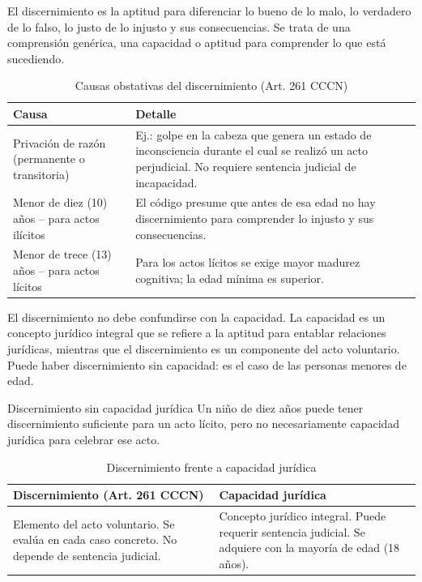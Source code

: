 \documentclass[12pt,oneside]{book}
\begin{document}
El discernimiento es la aptitud para diferenciar lo bueno de lo malo, lo verdadero de lo falso, lo justo de lo injusto y sus consecuencias. Se trata de una comprensión genérica, una capacidad o aptitud para comprender lo que está sucediendo.

\begin{table}[H]
\centering
\caption{Causas obstativas del discernimiento (Art. 261 CCCN)}
\begin{tabularx}{\textwidth}{l X}
\toprule
\textbf{Causa} & \textbf{Detalle} \\
\midrule
Privación de razón (permanente o transitoria) & Ej.: golpe en la cabeza que genera un estado de inconsciencia durante el cual se realizó un acto perjudicial. No requiere sentencia judicial de incapacidad. \\
Menor de diez (10) años -- para actos ilícitos & El código presume que antes de esa edad no hay discernimiento para comprender lo injusto y sus consecuencias. \\
Menor de trece (13) años -- para actos lícitos & Para los actos lícitos se exige mayor madurez cognitiva; la edad mínima es superior. \\
\bottomrule
\end{tabularx}
\end{table}

\begin{important}
El discernimiento no debe confundirse con la capacidad. La capacidad es un concepto jurídico integral que se refiere a la aptitud para entablar relaciones jurídicas, mientras que el discernimiento es un componente del acto voluntario. Puede haber discernimiento sin capacidad: es el caso de las personas menores de edad.
\end{important}

\begin{example}{Discernimiento sin capacidad jurídica}
Un niño de diez años puede tener discernimiento suficiente para un acto lícito, pero no necesariamente capacidad jurídica para celebrar ese acto.
\end{example}

\begin{table}[H]
\centering
\caption{Discernimiento frente a capacidad jurídica}
\begin{tabularx}{\textwidth}{X X}
\toprule
\textbf{Discernimiento (Art. 261 CCCN)} & \textbf{Capacidad jurídica} \\
\midrule
Elemento del acto voluntario. Se evalúa en cada caso concreto. No depende de sentencia judicial. & Concepto jurídico integral. Puede requerir sentencia judicial. Se adquiere con la mayoría de edad (18 años). \\
\bottomrule
\end{tabularx}
\end{table}
\end{document}
